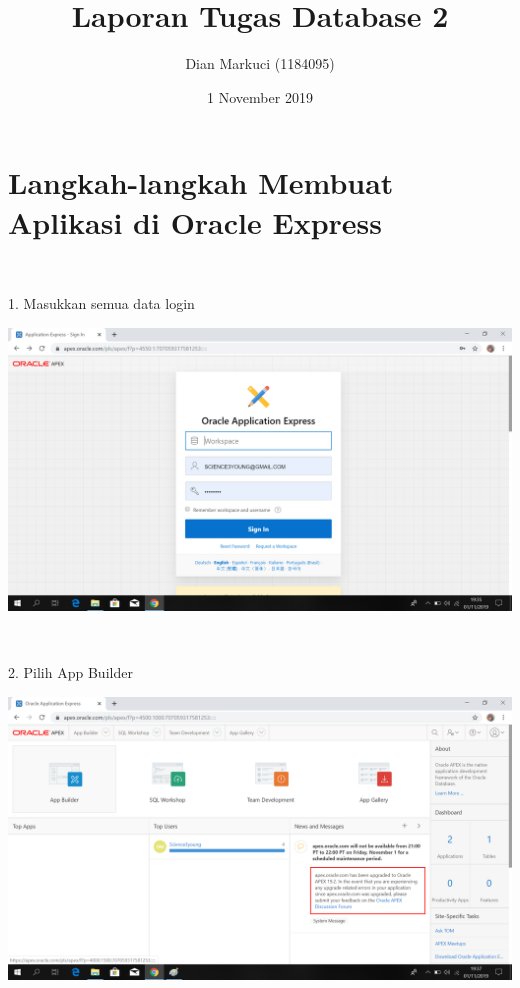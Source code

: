 \documentclass{article}
\title{Laporan Tugas Database 2}
\author{Dian Markuci (1184095)}
\date{1 November 2019}
\begin{document}
\maketitle

\section {\textbf Langkah-langkah Membuat Aplikasi di Oracle Express}\\

\item 1. Masukkan semua data login
\begin{center}
    \includegraphics[width=15cm\textwidth]{figure/1login.png}
\end{center}\\

\item 2. Pilih App Builder
\begin{center}
    \includegraphics[width=15cm\textwidth]{figure/2Appbuilder.png}\\
\end{center}
\end{document}
